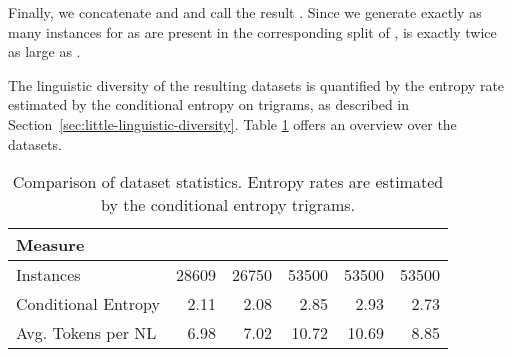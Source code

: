 Finally, we concatenate \nlmapstwo{} and \nlmapsthreeb{} and call the result
\nlmapsthree{}. Since we generate exactly as many instances for
\nlmapsthreeb{} as are present in the corresponding split of \nlmapstwoone{},
\nlmapsthree{} is exactly twice as large as \nlmapstwoone{}.

The linguistic diversity of the resulting datasets is quantified by the entropy
rate estimated by the conditional entropy on trigrams, as described in
Section~\ref{sec:little-linguistic-diversity}. Table \ref{tab:v2-v3-overview}
offers an overview over the datasets.

\begin{table}[h]
  \centering
  \begin{tabular}{lrrrrr}
    \toprule
    Measure & \nlmtwo{} & \nlmtwoone{} & \nlmthreea{} & \nlmthreeb{} & \nlmthree{}\\
    \midrule
    Instances & \num{28609} & \num{26750} & \num{53500} & \num{53500} & \num{53500}\\
    Conditional Entropy & \num{2.11} & \num{2.08} & \num{2.85} & \num{2.93} & \num{2.73}\\
    Avg. Tokens per NL & \num{6.98} & \num{7.02} & \num{10.72} & \num{10.69} & \num{8.85}\\
    \bottomrule
  \end{tabular}
  \caption[Dataset statistics]{Comparison of dataset statistics. Entropy rates
    are estimated by the conditional entropy trigrams.}
  \label{tab:v2-v3-overview}
\end{table}

